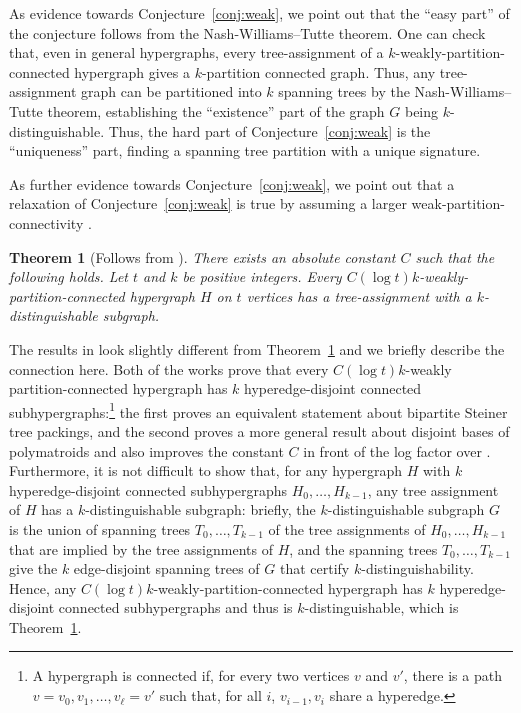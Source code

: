 \documentclass[11pt]{article}
\newtheorem{theorem}{Theorem}[section]
\begin{document}
As evidence towards Conjecture~\ref{conj:weak}, we point out that the ``easy part'' of the conjecture follows from the Nash-Williams--Tutte theorem.
One can check that, even in general hypergraphs, every tree-assignment of a $k$-weakly-partition-connected hypergraph gives a $k$-partition connected graph.
Thus, any tree-assignment graph can be partitioned into $k$ spanning trees by the Nash-Williams--Tutte theorem, establishing the ``existence'' part of the graph $G$ being $k$-distinguishable.
Thus, the hard part of Conjecture~\ref{conj:weak} is the ``uniqueness'' part, finding a spanning tree partition with a unique signature.


As further evidence towards Conjecture~\ref{conj:weak}, we point out that a relaxation of Conjecture~\ref{conj:weak} is true by assuming a larger weak-partition-connectivity \cite{CS07, CCV09}.
\begin{theorem}[Follows from \cite{CS07,CCV09}]
  \label{thm:conj-weak}
  There exists an absolute constant $C$ such that the following holds.
  Let $t$ and $k$ be positive integers.
  Every $C(\log t)k$-weakly-partition-connected hypergraph $H$ on $t$ vertices has a tree-assignment with a $k$-distinguishable subgraph.
\end{theorem}

The results in \cite{CS07,CCV09} look slightly different from Theorem~\ref{thm:conj-weak} and we briefly describe the connection here.
Both of the works prove that every $C(\log t)k$-weakly partition-connected hypergraph has $k$ hyperedge-disjoint connected subhypergraphs:\footnote{A hypergraph is connected if, for every two vertices $v$ and $v'$, there is a path $v=v_0,v_1,\dots,v_\ell=v'$ such that, for all $i$, $v_{i-1},v_i$ share a hyperedge.}
the first \cite{CS07} proves an equivalent statement about bipartite Steiner tree packings, and the second \cite{CCV09} proves a more general result about disjoint bases of polymatroids and also improves the constant $C$ in front of the log factor over \cite{CS07}.
Furthermore, it is not difficult to show that, for any hypergraph $H$ with $k$ hyperedge-disjoint connected subhypergraphs $H_0,\dots,H_{k-1}$, any tree assignment of $H$ has a $k$-distinguishable subgraph: briefly, the $k$-distinguishable subgraph $G$ is the union of spanning trees $T_0,\dots,T_{k-1}$ of the tree assignments of $H_0,\dots,H_{k-1}$ that are implied by the tree assignments of $H$, and the spanning trees $T_0,\dots,T_{k-1}$ give the $k$ edge-disjoint spanning trees of $G$ that certify $k$-distinguishability.
Hence, any $C(\log t)k$-weakly-partition-connected hypergraph has $k$ hyperedge-disjoint connected subhypergraphs and thus is $k$-distinguishable, which is Theorem~\ref{thm:conj-weak}.
\end{document}

